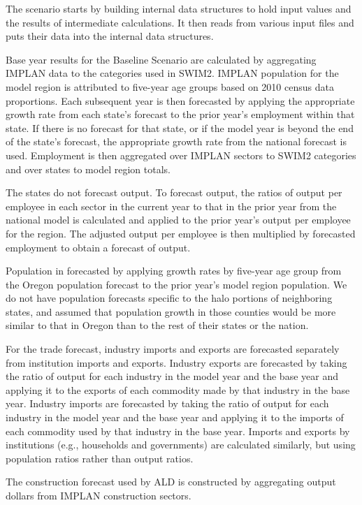 The scenario starts by building internal data structures to hold input values and the results of intermediate calculations. It then reads from various input files and puts their data into the internal data structures. 

Base year results for the Baseline Scenario are calculated by aggregating IMPLAN data to the categories used in SWIM2. IMPLAN population for the model region is attributed to five-year age groups based on 2010 census data proportions. Each subsequent year is then forecasted by applying the appropriate growth rate from each state's forecast to the prior year's employment within that state. If there is no forecast for that state, or if the model year is beyond the end of the state's forecast, the appropriate growth rate from the national forecast is used. Employment is then aggregated over IMPLAN sectors to SWIM2 categories and over states to model region totals.

The states do not forecast output. To forecast output, the ratios of output per employee in each sector in the current year to that in the prior year from the national model is calculated and applied to the prior year's output per employee for the region. The adjusted output per employee is then multiplied by forecasted employment to obtain a forecast of output.

Population in forecasted by applying growth rates by five-year age group from the Oregon population forecast to the prior year's model region population. We do not have population forecasts specific to the halo portions of neighboring states, and assumed that population growth in those counties would be more similar to that in Oregon than to the rest of their states or the nation.

For the trade forecast, industry imports and exports are forecasted separately from institution imports and exports. Industry exports are forecasted by taking the ratio of output for each industry in the model year and the base year and applying it to the exports of each commodity made by that industry in the base year. Industry imports are forecasted by taking the ratio of output for each industry in the model year and the base year and applying it to the imports of each commodity used by that industry in the base year. Imports and exports by institutions (e.g., households and governments) are calculated similarly, but using population ratios rather than output ratios.

The construction forecast used by ALD is constructed by aggregating output dollars from IMPLAN construction sectors.

